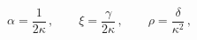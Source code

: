 \begin{equation}\label{lulymo3.8}
  \alpha = \frac{1}{2\kappa} \, , \qquad
  \xi = \frac{\gamma}{2\kappa} \, , \qquad
  \rho = \frac{\delta}{\kappa^2} \, ,
\end{equation}

